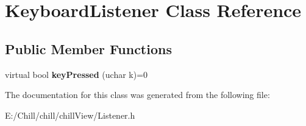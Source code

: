 \hypertarget{class_keyboard_listener}{}\section{Keyboard\+Listener Class Reference}
\label{class_keyboard_listener}
\subsection*{Public Member Functions}
\begin{DoxyCompactItemize}
\item 
\mbox{\label{class_keyboard_listener_aec13fb9d41e1b045b60052a3b4ea93ed}} 
virtual bool {\bfseries key\+Pressed} (uchar k)=0
\end{DoxyCompactItemize}


The documentation for this class was generated from the following file\+:\begin{DoxyCompactItemize}
\item 
E\+:/\+Chill/chill/chill\+View/Listener.\+h\end{DoxyCompactItemize}
